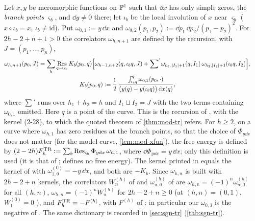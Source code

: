\begin{conv}
\label{conv:mod-kernel}
Let $x,y$ be meromorphic functions on $\mathbb{P}^1$ such that $\dd x$ has only simple zeros, the \emph{branch points} $\varsigma_b$, and $\dd y\neq 0$ there; let $\iota_b$ be the local involution of $x$ near $\varsigma_b$ ($x\circ\iota_b=x$, $\iota_b\neq\mathrm{id}$). Put $\omega_{0,1}:=y\,\dd x$ and $\omega_{0,2}(p_1,p_2):=\dd p_1\,\dd p_2/(p_1-p_2)^2$. For $2h-2+n+1>0$ the correlators $\omega_{h,n+1}$ are defined by the recursion, with $J=(p_1,\dots,p_n)$,
\begin{equation}
\label{eq:mod-kernel}
\begin{gathered}
\omega_{h,n+1}(p_0,J)=\sum_b\operatorname*{Res}_{q\to\varsigma_b}K_b(p_0,q)\Big[\omega_{h-1,n+2}(q,\iota_bq,J)+{\sum}'\,\omega_{h_1,|I_1|+1}(q,I_1)\,\omega_{h_2,|I_2|+1}(\iota_bq,I_2)\Big],\\
K_b(p_0,q):=\frac{1}{2}\,\frac{\int_{\iota_bq}^{q}\omega_{0,2}(p_0,\cdot)}{\big(y(q)-y(\iota_bq)\big)\,\mathrm{d} x(q)},
\end{gathered}
\end{equation}
where ${\sum}'$ runs over $h_1+h_2=h$ and $I_1\sqcup I_2=J$ with the two terms containing $\omega_{0,1}$ omitted. Here $q$ is a point of the curve. This is the recursion of \cite[(2-26)--(2-29)]{Dunin-Barkowski:2015caa}, with the kernel (2-28), to which the quoted theorem of \cref{thm:mod-tr} refers. For $h\geq 2$, on a curve where $\omega_{h,1}$ has zero residues at the branch points, so that the choice of $\Phi_{y\dd x}$ does not matter (for the model curve, \cref{lem:mod-xfun}), the free energy is defined by $(2-2h)F^{\mathrm{TR}}_h:=\sum_b\operatorname*{Res}_{\varsigma_b}\Phi_{y\mathrm{d} x}\,\omega_{h,1}$, where $\dd\Phi_{y\dd x}=y\,\dd x$; only this definition is used (it is that of \cite[(2.1)]{Hock25}; \cite{Dunin-Barkowski:2015caa} defines no free energy). The kernel printed in \cite[(4-3), (4-9)]{Eynard:2007kz} equals the kernel of \cite[(1.1)]{ABDKS25} with $\omega^{(0)}_{1,0}=-y\,\dd x$, and both are $-K_b$. Since $\omega_{h,n}$ is built with $2h-2+n$ kernels, the correlators $W^{(h)}_n$ of \cite{Eynard:2007kz} and $\omega^{(h)}_{n,0}$ of \cite{ABDKS25} are
$\omega_{h,n}=(-1)^n\omega^{(h)}_{n,0}$ for all $(h,n)$, $\omega_{h,n}=(-1)^nW^{(h)}_n$ for $2h-2+n\geq0$ (at $(h,n)=(0,1)$, $W^{(0)}_1=0$ \cite[(4-7)]{Eynard:2007kz}), and $F^{\mathrm{TR}}_h=-F^{(h)}$, with $F^{(h)}$ of \cite[Def.~4.3 (4-10)]{Eynard:2007kz}; in particular our $\omega_{0,3}$ is the negative of \cite[Thm.~4.1 (4-20)]{Eynard:2007kz}. The same dictionary is recorded in \cref{sec:sgn-tr} (\cref{tab:sgn-tr}).
\end{conv}

